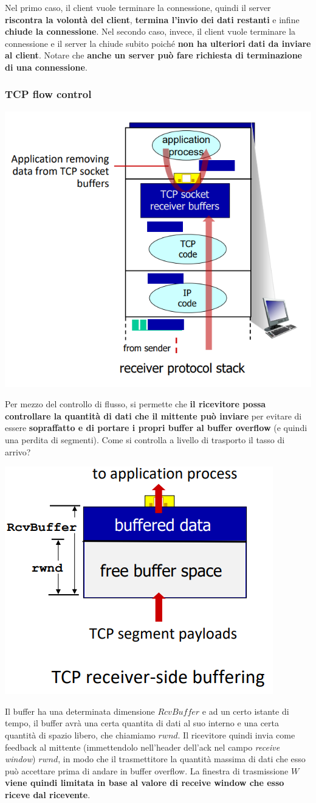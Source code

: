 \documentclass[12pt]{article}
\begin{document}
Nel primo caso, il client vuole terminare la connessione, quindi il server \textbf{riscontra la volontà del client}, \textbf{termina l'invio dei dati restanti} e infine \textbf{chiude la connessione}.
Nel secondo caso, invece, il client vuole terminare la connessione e il server la chiude subito poiché \textbf{non ha ulteriori dati da inviare al client}. Notare che \textbf{anche un server può fare richiesta di terminazione di una connessione}.
\newpage
\subsubsection{TCP flow control}
\begin{center}
    \includegraphics[width = 0.65\linewidth]{Images/64.png}
\end{center}
Per mezzo del controllo di flusso, si permette che \textbf{il ricevitore possa controllare la quantità di dati che il mittente può inviare} per evitare di essere \textbf{sopraffatto e di portare i propri buffer al buffer overflow} (e quindi una perdita di segmenti).
Come si controlla a livello di trasporto il tasso di arrivo?
\begin{center}
    \includegraphics[width = 0.45\linewidth]{Images/65.png}
\end{center}
Il buffer ha una determinata dimensione $RcvBuffer$ e ad un certo istante di tempo, il buffer avrà una certa quantita di dati al suo interno
e una certa quantità di spazio libero, che chiamiamo $rwnd$. Il ricevitore quindi invia come feedback al mittente (immettendolo nell'header dell'ack nel campo \textit{receive window})
$rwnd$, in modo che il trasmettitore la quantità massima di dati che esso può accettare prima di andare in buffer overflow.
La finestra di trasmissione $W$ \textbf{viene quindi limitata in base al valore di receive window che esso riceve dal ricevente}.
\end{document}
